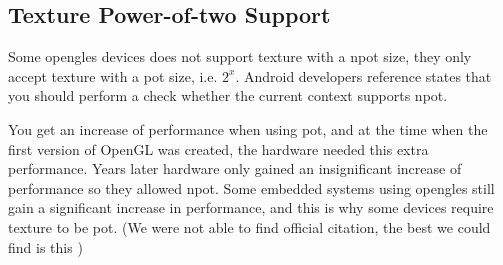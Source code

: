 \subsection{Texture Power-of-two Support}\label{sec:potsupport}
Some \ac{opengles} devices does not support texture with a \ac{npot} size, they only accept texture with a \ac{pot} size, i.e. $2^x$. Android developers reference states that you should perform a check whether the current context supports \ac{npot}. \citep{glutils}

You get an increase of performance when using \ac{pot}, and at the time when the first version of OpenGL was created, the hardware needed this extra performance. Years later hardware only gained an insignificant increase of performance so they allowed \ac{npot}. Some embedded systems using \ac{opengles} still gain a significant increase in performance, and this is why some devices require texture to be \ac{pot}. (We were not able to find official citation, the best we could find is this \citep{potperformance})

